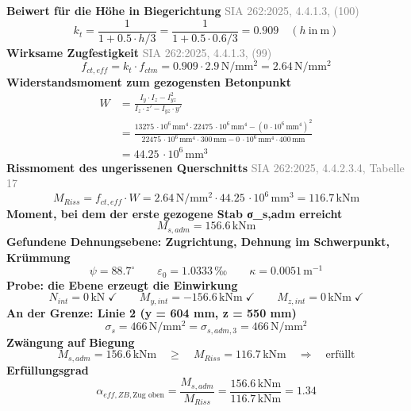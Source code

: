 \documentclass[11pt,a4paper]{article}
\newcommand{\normref}[1]{{\small\textcolor{gray}{#1}}}
\begin{document}
\noindent\textbf{Beiwert für die Höhe in Biegerichtung} \hfill \normref{SIA 262:2025, 4.4.1.3, (100)}
\begin{equation*}
k_t = \frac{1}{1 + 0.5 \cdot h/3} = \frac{1}{1 + 0.5 \cdot 0.6/3} = 0.909 \quad \left(h\ \text{in}\ \mathrm{m}\right)
\end{equation*}
\noindent\textbf{Wirksame Zugfestigkeit} \hfill \normref{SIA 262:2025, 4.4.1.3, (99)}
\begin{equation*}
f_{ct,eff} = k_t \cdot f_{ctm} = 0.909 \cdot 2.9\,\mathrm{N}/\mathrm{mm}^{2} = 2.64\,\mathrm{N}/\mathrm{mm}^{2}
\end{equation*}
\noindent\textbf{Widerstandsmoment zum gezogensten Betonpunkt}
\begin{equation*}
\begin{aligned}
  W &= \frac{I_y \cdot I_z - I_{yz}^{2}}{I_z \cdot z' - I_{yz} \cdot y'} \\
  &= \frac{13275\,\cdot 10^{6}\,\mathrm{mm}^{4} \cdot 22475\,\cdot 10^{6}\,\mathrm{mm}^{4} - \left(0\,\cdot 10^{6}\,\mathrm{mm}^{4}\right)^{2}}{22475\,\cdot 10^{6}\,\mathrm{mm}^{4} \cdot 300\,\mathrm{mm} - 0\,\cdot 10^{6}\,\mathrm{mm}^{4} \cdot 400\,\mathrm{mm}} \\
  &= 44.25\,\cdot 10^{6}\,\mathrm{mm}^{3}
\end{aligned}
\end{equation*}
\noindent\textbf{Rissmoment des ungerissenen Querschnitts} \hfill \normref{SIA 262:2025, 4.4.2.3.4, Tabelle 17}
\begin{equation*}
M_{Riss} = f_{ct,eff} \cdot W = 2.64\,\mathrm{N}/\mathrm{mm}^{2} \cdot 44.25\,\cdot 10^{6}\,\mathrm{mm}^{3} = 116.7\,\mathrm{kNm}
\end{equation*}
\noindent\textbf{Moment, bei dem der erste gezogene Stab σ\_s,adm erreicht}
\begin{equation*}
M_{s,adm} = 156.6\,\mathrm{kNm}
\end{equation*}
\noindent\textbf{Gefundene Dehnungsebene: Zugrichtung, Dehnung im Schwerpunkt, Krümmung}
\begin{equation*}
\psi = 88.7^\circ \qquad \varepsilon_0 = 1.0333\,\text{‰} \qquad \kappa = 0.0051\,\mathrm{m}^{-1}
\end{equation*}
\noindent\textbf{Probe: die Ebene erzeugt die Einwirkung}
\begin{equation*}
N_{int} = 0\,\mathrm{kN} \;\checkmark \qquad M_{y,int} = -156.6\,\mathrm{kNm} \;\checkmark \qquad M_{z,int} = 0\,\mathrm{kNm} \;\checkmark
\end{equation*}
\noindent\textbf{An der Grenze: Linie 2 (y = 604 mm, z = 550 mm)}
\begin{equation*}
\sigma_s = 466\,\mathrm{N}/\mathrm{mm}^{2} = \sigma_{s,adm,3} = 466\,\mathrm{N}/\mathrm{mm}^{2}
\end{equation*}
\noindent\textbf{Zwängung auf Biegung}
\begin{equation*}
M_{s,adm} = 156.6\,\mathrm{kNm} \quad \ge \quad M_{Riss} = 116.7\,\mathrm{kNm} \quad \Rightarrow \quad \text{erfüllt}
\end{equation*}
\noindent\textbf{Erfüllungsgrad}
\begin{equation*}
\alpha_{eff,ZB,\text{Zug oben}} = \frac{M_{s,adm}}{M_{Riss}} = \frac{156.6\,\mathrm{kNm}}{116.7\,\mathrm{kNm}} = 1.34
\end{equation*}
\end{document}
